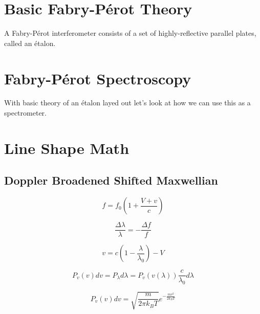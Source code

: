 \documentclass{article}
\begin{document}

\section{Basic Fabry-P\'{e}rot Theory}
A Fabry-P\'{e}rot interferometer consists of a set of highly-reflective parallel plates, called an \'{e}talon.


\section{Fabry-P\'{e}rot Spectroscopy}
With basic theory of an \'{e}talon layed out let's look at how we can use this as a spectrometer.


\section{Line Shape Math}

\subsection{Doppler Broadened Shifted Maxwellian}

\begin{equation}
f = f_0 ( 1 + \frac{V+v}{c} )
\end{equation}

\begin{equation}
\frac{\Delta \lambda}{\lambda} = - \frac{\Delta f}{f}
\end{equation}

\begin{equation}
v = c (1 - \frac{\lambda}{\lambda_0}) - V
\end{equation}

\begin{equation}
P_v(v) dv = P_{\lambda} d \lambda = P_v ( v(\lambda) ) \frac{c}{\lambda_0} d\lambda
\end{equation}

\begin{equation}
P_v(v) dv = \sqrt{\frac{m}{2 \pi k_B T}} e^{- \frac{m v^2}{2 k_B T}}
\end{equation}
\end{document}
